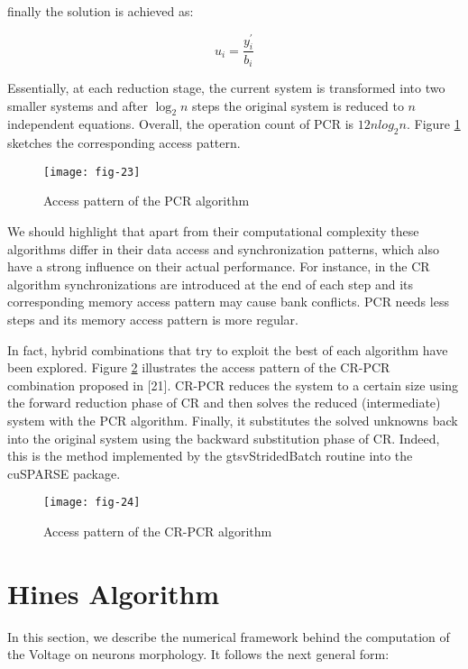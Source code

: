 finally the solution is achieved as:

\begin{equation}
    u_{i}=\frac{y_{i}^{\prime}}{b_{i}}
\end{equation}

Essentially, at each reduction stage, the current system is transformed into two smaller
systems and after $\log_2 n$ steps the original system is reduced to $n$ 
independent equations. Overall, the operation count of PCR is $12n log_2 n$. 
Figure \ref{fig:23} sketches the corresponding access pattern.

\vspace{5ex}
\begin{figure}[htbp]
    \centering
    \texttt{[image: fig-23]}
    \label{fig:23}
    \caption{Access pattern of the PCR algorithm}
\end{figure}

We should highlight that apart from their computational complexity these algorithms differ in their data access and synchronization patterns, which also have a strong
influence on their actual performance. For instance, in the CR algorithm synchronizations are introduced at the end of each step and its corresponding memory access
pattern may cause bank conflicts. PCR needs less steps and its memory access pattern
is more regular.

In fact, hybrid combinations that try to exploit the best of each algorithm have
been explored. Figure \ref{fig:24} illustrates the access pattern of the
CR-PCR combination proposed in [21]. CR-PCR reduces the system to a certain size
using the forward reduction phase of CR and then solves the reduced (intermediate)
system with the PCR algorithm. Finally, it substitutes the solved unknowns back into
the original system using the backward substitution phase of CR. Indeed, this is the
method implemented by the gtsvStridedBatch routine into the cuSPARSE package.

\vspace{5ex}
\begin{figure}[htbp]
    \centering
    \texttt{[image: fig-24]}
    \label{fig:24}
    \caption{Access pattern of the CR-PCR algorithm}
\end{figure}


\vspace{10ex}
\section{Hines Algorithm}
In this section, we describe the numerical framework behind the computation of the
Voltage on neurons morphology. It follows the next general form:

